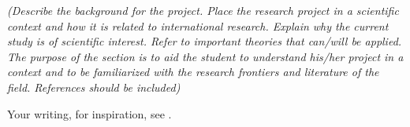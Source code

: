 %
%
\textit{(Describe the background for the project. Place the research project in a scientific context and how it is related to international research. Explain why the current study is of scientific interest. Refer to important theories that can/will be applied. The purpose of the section is to aid the student to understand his/her project in a context and to be familiarized with the research frontiers and literature of the field. References should be included)}
\vspace{1cm}


Your writing, for inspiration, see \cite{DBLP:journals/corr/abs-1907-12204}.













\printbibliography